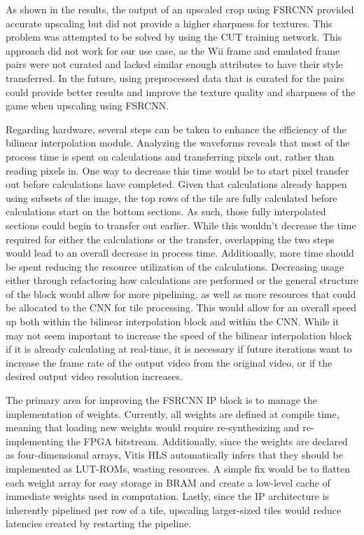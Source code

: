 \documentclass{article}
\begin{document}
\par As shown in the results, the output of an upscaled crop using FSRCNN provided accurate upscaling but did not provide a higher sharpness for textures. This problem was attempted to be solved by using the CUT training network. This approach did not work for our use case, as the Wii frame and emulated frame pairs were not curated and lacked similar enough attributes to have their style transferred. In the future, using preprocessed data that is curated for the pairs could provide better results and improve the texture quality and sharpness of the game when upscaling using FSRCNN.

\par Regarding hardware, several steps can be taken to enhance the efficiency of the bilinear interpolation module. Analyzing the waveforms reveals that most of the process time is spent on calculations and transferring pixels out, rather than reading pixels in. One way to decrease this time would be to start pixel transfer out before calculations have completed. Given that calculations already happen using subsets of the image, the top rows of the tile are fully calculated before calculations start on the bottom sections. As such, those fully interpolated sections could begin to transfer out earlier. While this wouldn’t decrease the time required for either the calculations or the transfer, overlapping the two steps would lead to an overall decrease in process time. Additionally, more time should be spent reducing the resource utilization of the calculations. Decreasing usage either through refactoring how calculations are performed or the general structure of the block would allow for more pipelining, as well as more resources that could be allocated to the CNN for tile processing. This would allow for an overall speed up both within the bilinear interpolation block and within the CNN. While it may not seem important to increase the speed of the bilinear interpolation block if it is already calculating at real-time, it is necessary if future iterations want to increase the frame rate of the output video from the original video, or if the desired output video resolution increases.

\par The primary area for improving the FSRCNN IP block is to manage the implementation of weights. Currently, all weights are defined at compile time, meaning that loading new weights would require re-synthesizing and re-implementing the FPGA bitstream. Additionally, since the weights are declared as four-dimensional arrays, Vitis HLS automatically infers that they should be implemented as LUT-ROMs, wasting resources. A simple fix would be to flatten each weight array for easy storage in BRAM and create a low-level cache of immediate weights used in computation. Lastly, since the IP architecture is inherently pipelined per row of a tile, upscaling larger-sized tiles would reduce latencies created by restarting the pipeline.
\end{document}
